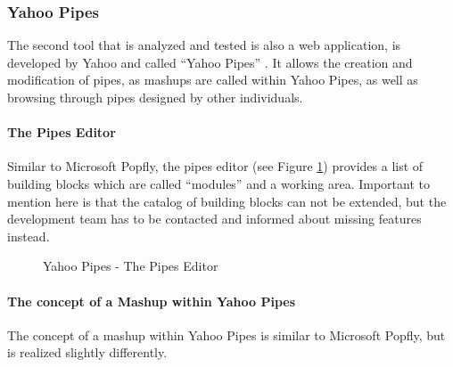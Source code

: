 \subsubsection{Yahoo Pipes}
\label{sec:yahoo_pipes}

The second tool that is analyzed and tested is also a web application, is
developed by Yahoo and called ``Yahoo Pipes'' \cite{yahoo_pipes}. It allows the
creation and modification of pipes, as mashups are called within Yahoo Pipes, as
well as browsing through pipes designed by other individuals.

\paragraph{The Pipes Editor}
Similar to Microsoft Popfly, the pipes editor (see Figure
\ref{fig:yahoo_pipes_pipes_editor}) provides a list of building blocks which are
called ``modules'' and a working area. Important to mention here is that the
catalog of building blocks can not be extended, but the development team has to be contacted and
informed about missing features instead.

\begin{figure}
	\centering
	\caption{Yahoo Pipes - The Pipes Editor}
	\label{fig:yahoo_pipes_pipes_editor}
\end{figure}

\paragraph{The concept of a Mashup within Yahoo Pipes}
The concept of a mashup within Yahoo Pipes is similar to Microsoft Popfly, but is realized slightly
differently.

